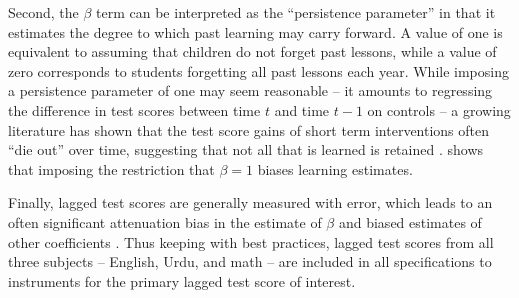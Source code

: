 \documentclass[Eubank_pk_ethnic_sorting.tex]{subfiles}
\begin{document}
Second, the $\beta$ term can be interpreted as the ``persistence parameter'' in that it estimates the degree to which past learning may carry forward. A value of one is equivalent to assuming that children do not forget past lessons, while a value of zero corresponds to students forgetting all past lessons each year. While imposing a persistence parameter of one may seem reasonable -- it amounts to regressing the difference in test scores between time $t$ and time $t-1$ on controls -- a growing literature has shown that the test score gains of short term interventions often ``die out'' over time, suggesting that not all that is learned is retained \citep{Banerjee:2007wx, Glewwe:2010hj,Currie:1995wo, Rothstein:2010bk}. \cite{Andrabi:2011hl} shows that imposing the restriction that $\beta=1$ biases learning estimates.

Finally, lagged test scores are generally measured with error, which leads to an often significant attenuation bias in the estimate of $\beta$ and biased estimates of other coefficients \citep{Kane:2002if,Chay:2005wu,Andrabi:2011hl}. Thus keeping with best practices, lagged test scores from all three subjects -- English, Urdu, and math -- are included in all specifications to instruments for the primary lagged test score of interest.
\end{document}
